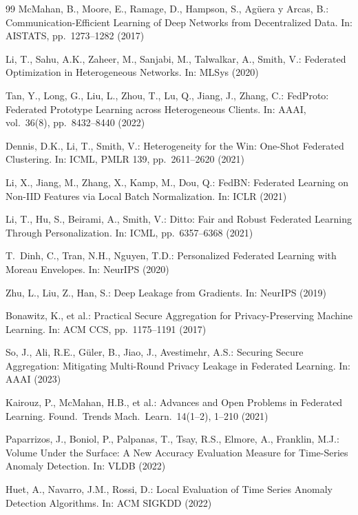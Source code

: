 \documentclass[11pt]{article}
\theoremstyle{plain}
\theoremstyle{definition}
\begin{document}
\begin{thebibliography}{99}
McMahan, B., Moore, E., Ramage, D., Hampson, S., Ag\"uera y Arcas, B.:
Communication-Efficient Learning of Deep Networks from Decentralized Data.
In: AISTATS, pp.\ 1273--1282 (2017)

Li, T., Sahu, A.K., Zaheer, M., Sanjabi, M., Talwalkar, A., Smith, V.:
Federated Optimization in Heterogeneous Networks. In: MLSys (2020)

Tan, Y., Long, G., Liu, L., Zhou, T., Lu, Q., Jiang, J., Zhang, C.:
FedProto: Federated Prototype Learning across Heterogeneous Clients.
In: AAAI, vol.\ 36(8), pp.\ 8432--8440 (2022)

Dennis, D.K., Li, T., Smith, V.:
Heterogeneity for the Win: One-Shot Federated Clustering.
In: ICML, PMLR 139, pp.\ 2611--2620 (2021)

Li, X., Jiang, M., Zhang, X., Kamp, M., Dou, Q.:
FedBN: Federated Learning on Non-IID Features via Local Batch Normalization.
In: ICLR (2021)

Li, T., Hu, S., Beirami, A., Smith, V.:
Ditto: Fair and Robust Federated Learning Through Personalization.
In: ICML, pp.\ 6357--6368 (2021)

T.\ Dinh, C., Tran, N.H., Nguyen, T.D.:
Personalized Federated Learning with Moreau Envelopes. In: NeurIPS (2020)

Zhu, L., Liu, Z., Han, S.: Deep Leakage from Gradients. In: NeurIPS (2019)

Bonawitz, K., et al.: Practical Secure Aggregation for Privacy-Preserving
Machine Learning. In: ACM CCS, pp.\ 1175--1191 (2017)

So, J., Ali, R.E., G\"uler, B., Jiao, J., Avestimehr, A.S.:
Securing Secure Aggregation: Mitigating Multi-Round Privacy Leakage in
Federated Learning. In: AAAI (2023)

Kairouz, P., McMahan, H.B., et al.:
Advances and Open Problems in Federated Learning.
Found.\ Trends Mach.\ Learn.\ 14(1--2), 1--210 (2021)

Paparrizos, J., Boniol, P., Palpanas, T., Tsay, R.S., Elmore, A., Franklin, M.J.:
Volume Under the Surface: A New Accuracy Evaluation Measure for Time-Series
Anomaly Detection. In: VLDB (2022)

Huet, A., Navarro, J.M., Rossi, D.:
Local Evaluation of Time Series Anomaly Detection Algorithms. In: ACM SIGKDD (2022)


\end{thebibliography}
\end{document}
